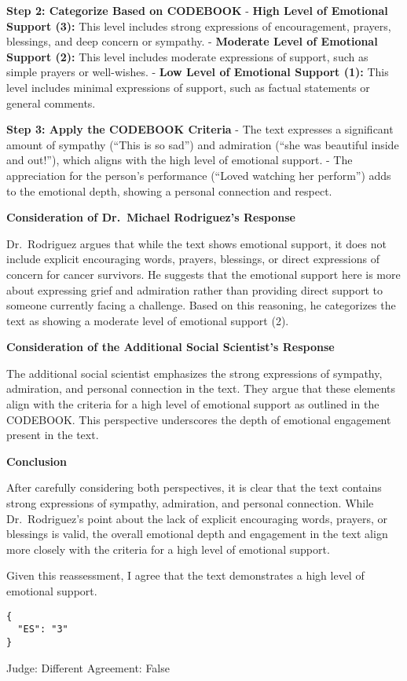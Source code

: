 \textbf{Step 2: Categorize Based on CODEBOOK} - \textbf{High Level of
Emotional Support (3):} This level includes strong expressions of
encouragement, prayers, blessings, and deep concern or sympathy. -
\textbf{Moderate Level of Emotional Support (2):} This level includes
moderate expressions of support, such as simple prayers or well-wishes.
- \textbf{Low Level of Emotional Support (1):} This level includes
minimal expressions of support, such as factual statements or general
comments.

\textbf{Step 3: Apply the CODEBOOK Criteria} - The text expresses a
significant amount of sympathy (``This is so sad'') and admiration
(``she was beautiful inside and out!''), which aligns with the high
level of emotional support. - The appreciation for the person's
performance (``Loved watching her perform'') adds to the emotional
depth, showing a personal connection and respect.

\textbf{Consideration of Dr.~Michael Rodriguez's
Response}

Dr.~Rodriguez argues that while the text shows emotional support, it
does not include explicit encouraging words, prayers, blessings, or
direct expressions of concern for cancer survivors. He suggests that the
emotional support here is more about expressing grief and admiration
rather than providing direct support to someone currently facing a
challenge. Based on this reasoning, he categorizes the text as showing a
moderate level of emotional support (2).

\textbf{Consideration of the Additional Social Scientist's
Response}

The additional social scientist emphasizes the strong expressions of
sympathy, admiration, and personal connection in the text. They argue
that these elements align with the criteria for a high level of
emotional support as outlined in the CODEBOOK. This perspective
underscores the depth of emotional engagement present in the text.

\textbf{Conclusion}

After carefully considering both perspectives, it is clear that the text
contains strong expressions of sympathy, admiration, and personal
connection. While Dr.~Rodriguez's point about the lack of explicit
encouraging words, prayers, or blessings is valid, the overall emotional
depth and engagement in the text align more closely with the criteria
for a high level of emotional support.

Given this reassessment, I agree that the text demonstrates a high level
of emotional support.

\begin{verbatim}
{
  "ES": "3"
}
\end{verbatim}

Judge: Different Agreement: False